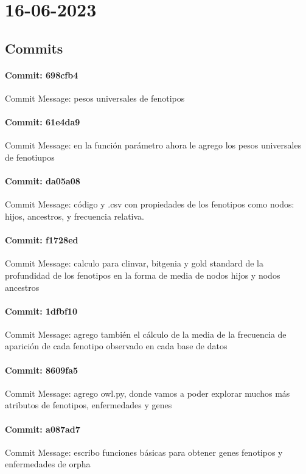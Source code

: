 \documentclass{article}
\begin{document}
\section{16-06-2023}
\subsection{Commits}
\paragraph{Commit: 698cfb4}
Commit Message: pesos universales de fenotipos

\paragraph{Commit: 61e4da9}
Commit Message: en la función parámetro ahora le agrego los pesos universales de fenotiupos

\paragraph{Commit: da05a08}
Commit Message: código y .csv con propiedades de los fenotipos como nodos: hijos, ancestros, y frecuencia relativa.

\paragraph{Commit: f1728ed}
Commit Message: calculo para clinvar, bitgenia y gold standard de la profundidad de los fenotipos en la forma de media de nodos hijos y nodos ancestros

\paragraph{Commit: 1dfbf10}
Commit Message: agrego también el cálculo de la media de la frecuencia de aparición de cada fenotipo observado en cada base de datos

\paragraph{Commit: 8609fa5}
Commit Message: agrego owl.py, donde vamos a poder explorar muchos más atributos de fenotipos, enfermedades y genes

\paragraph{Commit: a087ad7}
Commit Message: escribo funciones básicas para obtener genes fenotipos y enfermedades de orpha
\end{document}
